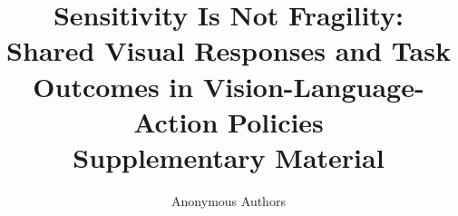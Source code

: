 \documentclass[10pt,twocolumn,letterpaper]{article}
\title{Sensitivity Is Not Fragility:\\Shared Visual Responses and Task Outcomes in Vision-Language-Action Policies\\Supplementary Material}
\author{Anonymous Authors}
\begin{document}
\raggedbottom
\maketitle
\renewcommand{\thefigure}{S\arabic{figure}}
\renewcommand{\thetable}{S\arabic{table}}
\renewcommand{\thesection}{S\arabic{section}}
\renewcommand{\theequation}{S\arabic{equation}}




\clearpage
\onecolumn

\clearpage
\twocolumn





\clearpage

\clearpage


\clearpage

\clearpage


\clearpage










\FloatBarrier
{\small}
\end{document}
